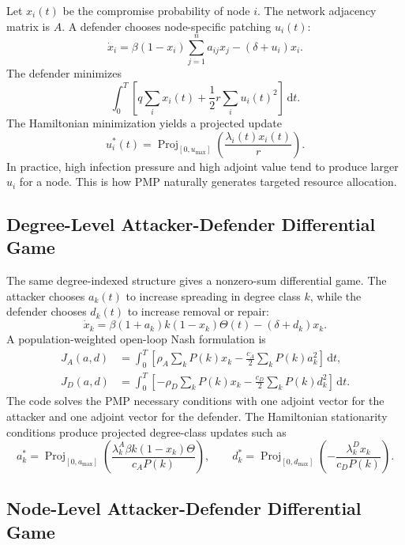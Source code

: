\documentclass[11pt,a4paper]{article}
\newcommand{\dd}{\,\mathrm{d}}
\newcommand{\Proj}{\operatorname{Proj}}
\begin{document}
Let $x_i(t)$ be the compromise probability of node $i$. The network adjacency matrix is $A$. A defender chooses node-specific patching $u_i(t)$:
\begin{equation}
  \dot{x}_i=\beta(1-x_i)\sum_{j=1}^n a_{ij}x_j-(\delta+u_i)x_i.
\end{equation}
The defender minimizes
\begin{equation}
  \int_0^T\left[q\sum_i x_i(t)+\frac{1}{2}r\sum_i u_i(t)^2\right]\dd t.
\end{equation}
The Hamiltonian minimization yields a projected update
\begin{equation}
  u_i^*(t)=\Proj_{[0,u_{\max}]}
  \left(\frac{\lambda_i(t)x_i(t)}{r}\right).
\end{equation}
In practice, high infection pressure and high adjoint value tend to produce larger $u_i$ for a node. This is how PMP naturally generates targeted resource allocation.


\subsection{Degree-Level Attacker-Defender Differential Game}

The same degree-indexed structure gives a nonzero-sum differential game. The attacker chooses $a_k(t)$ to increase spreading in degree class $k$, while the defender chooses $d_k(t)$ to increase removal or repair:
\begin{equation}
  \dot{x}_k=\beta(1+a_k)k(1-x_k)\Theta(t)-(\delta+d_k)x_k.
\end{equation}
A population-weighted open-loop Nash formulation is
\begin{align}
  J_A(a,d)&=\int_0^T\left[\rho_A\sum_kP(k)x_k-\frac{c_A}{2}\sum_kP(k)a_k^2\right]\dd t,\\
  J_D(a,d)&=\int_0^T\left[-\rho_D\sum_kP(k)x_k-\frac{c_D}{2}\sum_kP(k)d_k^2\right]\dd t.
\end{align}
The code solves the PMP necessary conditions with one adjoint vector for the attacker and one adjoint vector for the defender. The Hamiltonian stationarity conditions produce projected degree-class updates such as
\begin{equation}
  a_k^*=\Proj_{[0,a_{\max}]}\left(\frac{\lambda^A_k\beta k(1-x_k)\Theta}{c_AP(k)}\right),\qquad
  d_k^*=\Proj_{[0,d_{\max}]}\left(-\frac{\lambda^D_kx_k}{c_DP(k)}\right).
\end{equation}

\subsection{Node-Level Attacker-Defender Differential Game}
\end{document}
